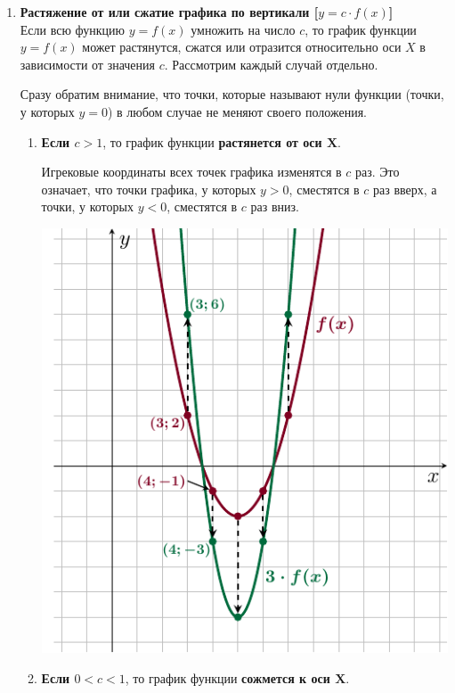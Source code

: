 \documentclass[10pt, a4paper]{article}
\begin{document}
\begin{enumerate}
\begin{enumerate}[label=\asbuk*)]
\begin{minipage}[c][][c]{0.45\textwidth}
\begin{center}
		\end{center}
		\end{minipage}
	\end{enumerate}
	\item \textbf{Растяжение от или сжатие графика по вертикали [\boldmath$y=c\cdot f(x)$]}\\[1em]
	Если всю функцию $y=f(x)$ умножить на число $c$, то график функции $y=f(x)$ может растянутся, сжатся или отразится относительно оси $X$ в зависимости от значения $c$. Рассмотрим каждый случай отдельно.
	
	Сразу обратим внимание, что точки, которые называют нули функции (точки, у которых $y=0$) в любом случае не меняют своего положения.
	\begin{enumerate}[label=\asbuk*)]
		\item 
		\begin{minipage}[t]{0.65\textwidth}
			\textbf{Если \boldmath$ c>1$}, то график функции \textbf{растянется от оси $\boldsymbol X$}.
			
			Игрековые координаты всех точек графика изменятся в $c$ раз. Это означает, что точки графика, у которых $y>0$, сместятся в $c$ раз вверх, а точки, у которых $y<0$, сместятся в $c$ раз вниз.
		\end{minipage}
		\begin{minipage}[t]{0.25\textwidth}
			\begin{flushright}
				\includegraphics[align=t, width=\textwidth]{../graphs/graph_6/graph_6}
			\end{flushright}
		\end{minipage}
		\item
		\begin{minipage}[t]{0.65\textwidth}
			\textbf{Если \boldmath$0<c<1$}, то график функции \textbf{сожмется к оси $\boldsymbol X$}.
			

\end{minipage}
\end{enumerate}
\end{enumerate}
\end{document}
